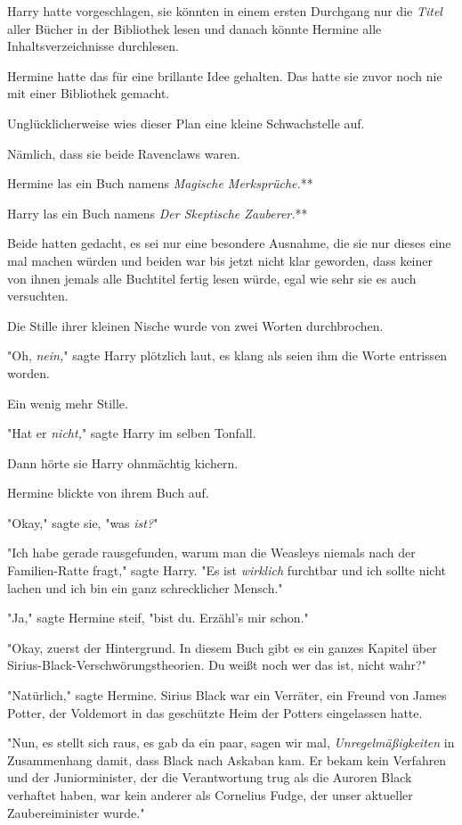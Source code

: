 {Harry hatte vorgeschlagen, sie könnten in einem ersten Durchgang nur die \emph{Titel} aller Bücher in der Bibliothek lesen und danach könnte Hermine alle Inhaltsverzeichnisse durchlesen.

Hermine hatte das für eine brillante Idee gehalten. Das hatte sie zuvor noch nie mit einer Bibliothek gemacht.

Unglücklicherweise wies dieser Plan eine kleine Schwachstelle auf.

Nämlich, dass sie beide Ravenclaws waren.

Hermine las ein Buch namens \emph{Magische Merksprüche.}**

Harry las ein Buch namens \emph{Der Skeptische Zauberer.}**

Beide hatten gedacht, es sei nur eine besondere Ausnahme, die sie nur dieses eine mal machen würden und beiden war bis jetzt nicht klar geworden, dass keiner von ihnen jemals alle Buchtitel fertig lesen würde, egal wie sehr sie es auch versuchten.

Die Stille ihrer kleinen Nische wurde von zwei Worten durchbrochen.

"Oh, \emph{nein,}" sagte Harry plötzlich laut, es klang als seien ihm die Worte entrissen worden.

Ein wenig mehr Stille.

"Hat er \emph{nicht,}" sagte Harry im selben Tonfall.

Dann hörte sie Harry ohnmächtig kichern.

Hermine blickte von ihrem Buch auf.

"Okay," sagte sie, "was \emph{ist?}"

"Ich habe gerade rausgefunden, warum man die Weasleys niemals nach der Familien-Ratte fragt," sagte Harry. "Es ist \emph{wirklich} furchtbar und ich sollte nicht lachen und ich bin ein ganz schrecklicher Mensch."

"Ja," sagte Hermine steif, "bist du. Erzähl's mir schon."

"Okay, zuerst der Hintergrund. In diesem Buch gibt es ein ganzes Kapitel über Sirius-Black-Verschwörungstheorien. Du weißt noch wer das ist, nicht wahr?"

"Natürlich," sagte Hermine. Sirius Black war ein Verräter, ein Freund von James Potter, der Voldemort in das geschützte Heim der Potters eingelassen hatte.

"Nun, es stellt sich raus, es gab da ein paar, sagen wir mal, \emph{Unregelmäßigkeiten} in Zusammenhang damit, dass Black nach Askaban kam. Er bekam kein Verfahren und der Juniorminister, der die Verantwortung trug als die Auroren Black verhaftet haben, war kein anderer als Cornelius Fudge, der unser aktueller Zaubereiminister wurde."

}
